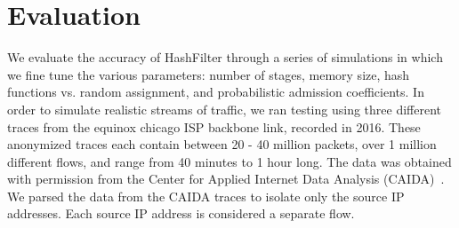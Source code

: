 \section{Evaluation}
\label{sec:eval}
We evaluate the accuracy of HashFilter through a series of simulations in which we fine tune the various parameters: number of stages, memory size, hash functions vs. random assignment, and probabilistic admission coefficients. In order to simulate realistic streams of traffic, we ran testing using three different traces from the equinox chicago ISP backbone link, recorded in 2016. These anonymized traces each contain between 20 - 40 million packets, over 1 million different flows, and range from 40 minutes to 1 hour long. The data was obtained with permission from the Center for Applied Internet Data Analysis (CAIDA)~\cite{caida}. We parsed the data from the CAIDA traces to isolate only the source IP addresses. Each source IP address is considered a separate flow.
